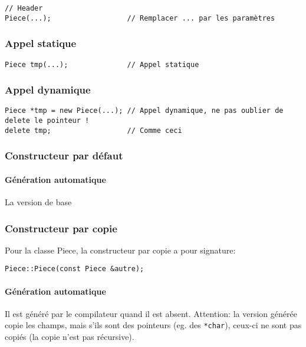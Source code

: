 \documentclass[10pt,a4paper,french]{article}
\begin{document}
\begin{verbatim}
// Header
Piece(...);                  // Remplacer ... par les paramètres
\end{verbatim}

\subsubsection{Appel statique}

\begin{verbatim}
Piece tmp(...);              // Appel statique
\end{verbatim}

\subsubsection{Appel dynamique}

\begin{verbatim}
Piece *tmp = new Piece(...); // Appel dynamique, ne pas oublier de delete le pointeur !
delete tmp;                  // Comme ceci
\end{verbatim}

\subsubsection{Constructeur par défaut}

\paragraph{Génération automatique}
La version de base 

\subsubsection{Constructeur par copie}

Pour la classe Piece, la constructeur par copie a pour signature:

\begin{verbatim}
Piece::Piece(const Piece &autre);
\end{verbatim}

\paragraph{Génération automatique}

Il est généré par le compilateur quand il est absent. Attention: la version générée copie les champs, mais s'ils sont des pointeurs (eg. des \texttt{*char}), ceux-ci ne sont pas copiés (la copie n'est pas récursive).
\end{document}
